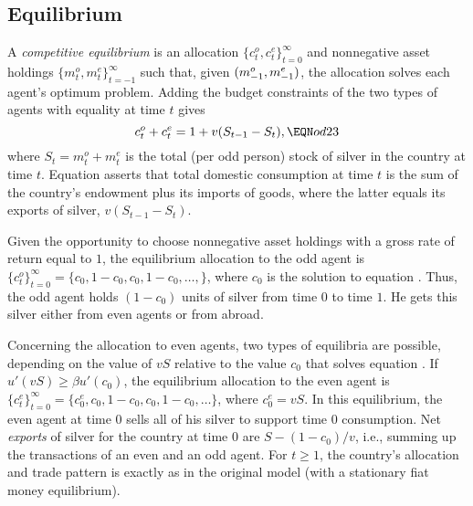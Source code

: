 \subsection{Equilibrium}

   A {\it competitive equilibrium\/} is an allocation
$\{c_t^o, c_t^e\}_{t=0}^\infty$ and nonnegative
asset holdings $\{m_t^o, m_t^e\}_{t=-1}^\infty$
such that, given $(m^o_{-1},\hfil\break m^e_{-1})$,
the allocation solves each agent's
optimum problem.
\medskip
  Adding the budget constraints  of the two types of agents with
equality at time
$t$ gives
$$ c_t^o + c_t^e = 1 +v(S_{t-1} - S_t) , \EQN od23  $$
where   $S_t = m_t^o+ m_t^e$ is the total (per odd person) stock
of silver in the country at time $t$.
Equation  asserts that total domestic consumption at
time $t$ is the sum of the country's endowment plus
its imports of goods, where the latter equals its exports of silver,
$v (S_{t-1} - S_t)$.

Given the opportunity to choose nonnegative asset holdings with a
gross rate of return equal to $1$,
the equilibrium allocation to the odd agent is
$\{c_t^o\}_{t=0}^{\infty} =\{c_0, 1-c_0, c_0, 1-c_0, \ldots, \}$,
where $c_0$ is the solution to equation . Thus, the odd
agent holds $(1-c_0)$ units of silver from time $0$ to time $1$.  He
gets this silver either from even agents or from abroad.

Concerning the allocation to even agents, two types of equilibria are
possible, depending on the value of $v S$ relative to the
value $c_0$ that solves equation .
If $u'(v S) \geq \beta u'(c_0)$, the equilibrium allocation
to the even agent is
$\{c_t^e\}_{t=0}^{\infty} =\{ c_0^e, c_0, 1-c_0, c_0, 1-c_0, \ldots \}$,
where $c_0^e = v S$.  In this equilibrium, the
even agent at time $0$ sells all of his silver to support
time $0$ consumption.    Net {\it exports\/} of silver for the
country at time $0$ are $S - (1-c_0)/v$, i.e., summing up the
transactions of an even and an odd agent.  For $t \geq 1$, the country's
allocation and trade pattern is exactly as in the original
model (with a stationary fiat money equilibrium).


